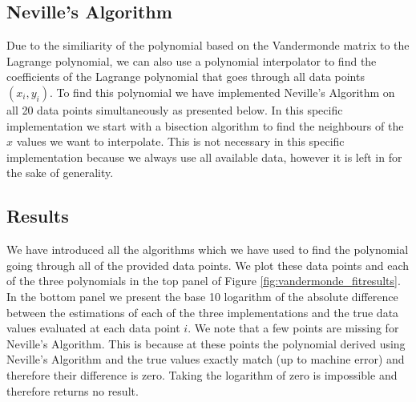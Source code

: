 \subsection{Neville's Algorithm}

Due to the similiarity of the polynomial based on the Vandermonde matrix to the Lagrange polynomial, we can also use a polynomial interpolator to find the coefficients of the Lagrange polynomial that goes through all data points $(x_i, y_i)$. To find this polynomial we have implemented Neville's Algorithm on all 20 data points simultaneously as presented below. In this specific implementation we start with a bisection algorithm to find the neighbours of the $x$ values we want to interpolate. This is not necessary in this specific implementation because we always use all available data, however it is left in for the sake of generality. 



\subsection{Results}

We have introduced all the algorithms which we have used to find the polynomial going through all of the provided data points. We plot these data points and each of the three polynomials in the top panel of Figure \ref{fig:vandermonde_fitresults}. In the bottom panel we present the base 10 logarithm of the absolute difference between the estimations of each of the three implementations and the true data values evaluated at each data point $i$. We note that a few points are missing for Neville's Algorithm. This is because at these points the polynomial derived using Neville's Algorithm and the true values exactly match (up to machine error) and therefore their difference is zero. Taking the logarithm of zero is impossible and therefore returns no result.

